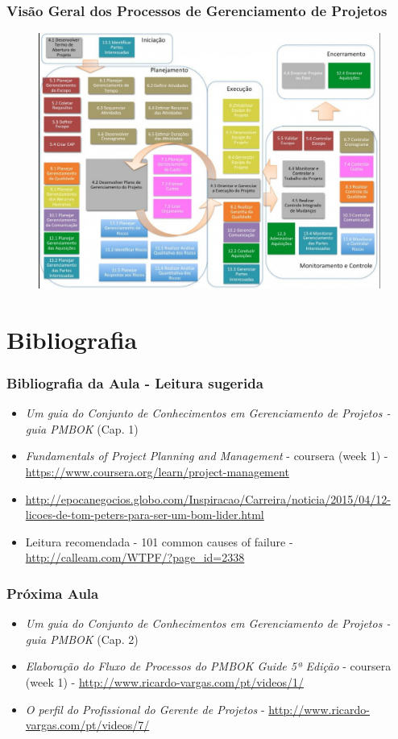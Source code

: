 \begin{frame}
 \frametitle{Visão Geral dos Processos de Gerenciamento de Projetos}
 \begin{figure}
  \centering
  \includegraphics[width = \textwidth]{figs/figura-4-1024x765.jpg}
 \end{figure}
\end{frame}
\section{Bibliografia}
\begin{frame}
 \frametitle{Bibliografia da Aula - Leitura sugerida}
 \begin{itemize}
  \item \textit{Um guia do Conjunto de Conhecimentos em Gerenciamento de Projetos - guia PMBOK} (Cap. 1)
  \item \textit{Fundamentals of Project Planning and Management} - coursera (week 1) - \url{https://www.coursera.org/learn/project-management}
  \item \url{http://epocanegocios.globo.com/Inspiracao/Carreira/noticia/2015/04/12-licoes-de-tom-peters-para-ser-um-bom-lider.html}
  \item Leitura recomendada - 101 common causes of failure - \url{http://calleam.com/WTPF/?page_id=2338}
 \end{itemize}

\end{frame}

\begin{frame}
 \frametitle{Próxima Aula}
 \begin{itemize}
  \item \textit{Um guia do Conjunto de Conhecimentos em Gerenciamento de Projetos - guia PMBOK} (Cap. 2)
  \item \textit{Elaboração do Fluxo de Processos do PMBOK Guide 5ª Edição} - coursera (week 1) - \url{http://www.ricardo-vargas.com/pt/videos/1/}
  \item \textit{O perfil do Profissional do Gerente de Projetos} - \url{http://www.ricardo-vargas.com/pt/videos/7/}
 \end{itemize}

\end{frame}
